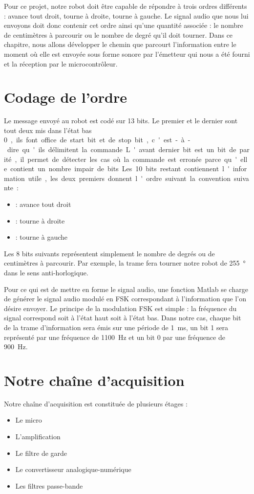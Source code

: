 Pour ce projet, notre robot doit être capable de répondre à trois ordres différents : avance tout droit, tourne à droite, tourne à gauche. Le signal audio que nous lui envoyons doit donc contenir cet ordre ainsi qu'une quantité associée : le nombre de centimètres à parcourir ou le nombre de degré qu'il doit tourner. Dans ce chapitre, nous allons développer le chemin que parcourt l'information entre le moment où elle est envoyée sous forme sonore par l'émetteur qui nous a été fourni et la réception par le microcontrôleur.

\section{Codage de l'ordre}
Le message envoyé au robot est codé sur 13 bits. Le premier et le dernier sont tout deux mis dans l'état bas \SI{0}, ils font office de start bit et de stop bit, c'est-à-dire qu'ils délimitent la commande. L'avant dernier bit est un bit de parité, il permet de détecter les cas où la commande est erronée parce qu'elle contient un nombre impair de bits. Les \SI{10} bits restant contiennent l'information utile, les deux premiers donnent l'ordre suivant la convention suivante :
\begin{itemize}
\item {} : avance tout droit
\item {} : tourne à droite
\item {} : tourne à gauche
\end{itemize}
Les 8 bits suivants représentent simplement le nombre de degrés ou de centimètres à parcourir. Par exemple, la trame  fera tourner notre robot de \SI{255}{\degree} dans le sens anti-horlogique.

Pour ce qui est de mettre en forme le signal audio, une fonction Matlab se charge de générer le signal audio modulé en FSK correspondant à l'information que l'on désire envoyer. Le principe de la modulation FSK est simple : la fréquence du signal correspond soit à l'état haut soit à l'état bas. Dans notre cas, chaque bit de la trame d'information sera émis sur une période de \SI{1}{\milli\second}, un bit 1 sera représenté par une fréquence de \SI{1100}{\hertz} et un bit 0 par une fréquence de \SI{900}{\hertz}. 

\section{Notre chaîne d'acquisition}
Notre chaîne d'acquisition est constituée de plusieurs étages :
\begin{itemize}
\item Le micro
\item L'amplification
\item Le filtre de garde
\item Le convertisseur analogique-numérique
\item Les filtres passe-bande
\end{itemize}


